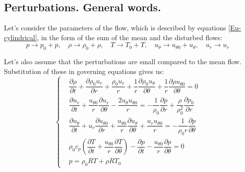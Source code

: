 \subsection{Perturbations. General words.}

Let's consider the parameters of the flow, which is described by equations \eqref{Eu-cylindrical}, in the form of the sum of the mean and the disturbed flows:
\begin{equation}
	p \rightarrow p_0 + p,\quad \rho \rightarrow \rho_0 + \rho,\quad T \rightarrow T_0 + T,\quad u_{\theta} \rightarrow u_{\theta 0} + u_{\theta},\quad u_r \rightarrow u_r
\end{equation}

Let's also assume that the perturbations are small compared to the mean flow. Substitution of these in governing equations gives us:
\begin{equation}
	\label{PF_Euler}
	\left\{
	\begin{aligned}
		& \dfrac{\partial \rho}{\partial t} + \dfrac{\partial \rho_0 u_r}{\partial r} + \dfrac{\rho_0 u_r}{r} + \dfrac{1}{r}\dfrac{\partial \rho_0 u_{\theta}}{\partial \theta} + \dfrac{1}{r} \dfrac{\partial \rho u_{\theta 0}}{\partial \theta} = 0 \\
		& \dfrac{\partial u_r}{\partial t} + \dfrac{u_{\theta 0}}{r}\dfrac{\partial u_r}{\partial \theta} - \dfrac{2 u_{\theta}u_{\theta 0}}{r} = - \dfrac{1}{\rho_0}\dfrac{\partial p}{\partial r} + \dfrac{\rho}{\rho_0^2}\dfrac{\partial p_0}{\partial r} \\
		& \dfrac{\partial u_{\theta}}{\partial t} + u_r \dfrac{\partial u_{\theta 0}}{\partial r} + \dfrac{u_{\theta 0}}{r}\dfrac{\partial u_{\theta}}{\partial \theta} + \dfrac{u_r u_{\theta 0}}{r} = - \dfrac{1}{\rho_0 r}\dfrac{\partial p}{\partial \theta} \\
		& \rho_0 c_p \left(\dfrac{\partial T}{\partial t} + \dfrac{u_{\theta 0}}{r}\dfrac{\partial T}{\partial \theta}\right) - \dfrac{\partial p}{\partial t} - \dfrac{u_{\theta 0}}{r}\dfrac{\partial p}{\partial \theta} = 0 \\
		& p = \rho_0 R T + \rho R T_0
	\end{aligned}
	\right.
\end{equation}

